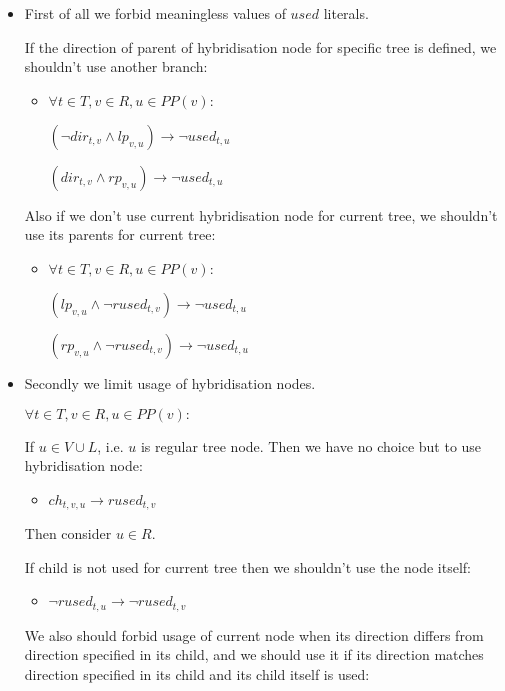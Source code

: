 \documentclass[runningheads, envcountsame, a4paper]{llncs}
\begin{document}
\begin{itemize}

\item First of all we forbid meaningless values of $used$ literals.

	If the direction of parent of hybridisation node for specific tree is defined, we shouldn't use another branch:
    \begin{itemize}
    \item $\forall t \in T, v \in R, u \in PP(v):$
    
    $(\neg dir_{t,v} \wedge lp_{v,u}) \rightarrow \neg used_{t,u}$
    
    $(dir_{t,v} \wedge rp_{v,u}) \rightarrow \neg used_{t,u}$
    \end{itemize}
	Also if we don't use current hybridisation node for current tree, we shouldn't use its parents for current tree:
	\begin{itemize}
	\item $\forall t \in T, v \in R, u \in PP(v):$
	
	$(lp_{v,u} \wedge \neg rused_{t,v}) \rightarrow \neg used_{t,u}$
	
	$(rp_{v,u} \wedge \neg rused_{t,v}) \rightarrow \neg used_{t,u}$
	\end{itemize}

\item Secondly we limit usage of hybridisation nodes.

	$\forall t \in T, v \in R, u \in PP(v):$
	
    If $u \in V \cup L$, i.e. $u$ is regular tree node. Then we have no choice but to use hybridisation node:

    \begin{itemize}
	\item $ch_{t,v,u} \rightarrow rused_{t,v}$
	\end{itemize}
    
    Then consider $u \in R$.
    
    If child is not used for current tree then we shouldn't use the node itself:

    \begin{itemize}
    \item $\neg rused_{t,u} \rightarrow \neg rused_{t,v}$
    \end{itemize}

	We also should forbid usage of current node when its direction differs from direction specified in its child, 
	and we should use it if its direction matches direction specified in its child and its child itself is used:


\end{itemize}
\end{document}
